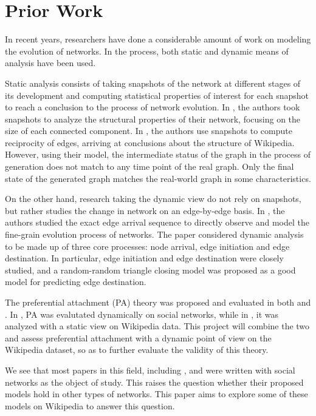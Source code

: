 \documentclass[10pt,twocolumn]{article}
\begin{document}
\section{Prior Work}

In recent years, researchers have done a considerable amount of work on modeling the evolution of networks. In the process, both static and dynamic means of analysis have been used.

Static analysis consists of taking snapshots of the network at different stages of its development and computing statistical properties of interest for each snapshot to reach a conclusion to the process of network evolution. In \cite{kumar2010structure}, the authors took snapshots to analyze the structural properties of their network, focusing on the size of each connected component. In \cite{zlatic2011model}, the authors use snapshots to compute reciprocity of edges, arriving at conclusions about the structure of Wikipedia. However, using their model, the intermediate status of the graph in the process of generation does not match to any time point of the real graph. Only the final state of the generated graph matches the real-world graph in some characteristics.

On the other hand, research taking the dynamic view do not rely on snapshots, but rather studies the change in network on an edge-by-edge basis. In \cite{leskovec2008microscopic}, the authors studied the exact edge arrival sequence to directly observe and model the fine-grain evolution process of networks. The paper considered dynamic analysis to be made up of three core processes: node arrival, edge initiation and edge destination. In particular, edge initiation and edge destination were closely studied, and a random-random triangle closing model was proposed as a good model for predicting edge destination.

The preferential attachment (PA) theory was proposed and evaluated in both \cite{leskovec2008microscopic} and \cite{zlatic2011model}. In \cite{leskovec2008microscopic}, PA was evalutated dynamically on social networks, while in \cite{zlatic2011model}, it was analyzed with a static view on Wikipedia data. This project will combine the two and assess preferential attachment with a dynamic point of view on the Wikipedia dataset, so as to further evaluate the validity of this theory.

We see that most papers in this field, including \cite{leskovec2008microscopic}, \cite{kossinets2006empirical} and \cite{kumar2010structure} were written with social networks as the object of study. This raises the question whether their proposed models hold in other types of networks. This paper aims to explore some of these models on Wikipedia to answer this question.
\end{document}
